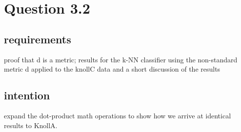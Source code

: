 \section*{Question 3.2}
\subsection*{requirements}
proof that d is a metric; results for the k-NN classifier using the non-standard metric d applied to the knollC data and a short discussion of the results

\subsection*{intention}
expand the dot-product math operations to show how we arrive at identical 
results to KnollA.

 